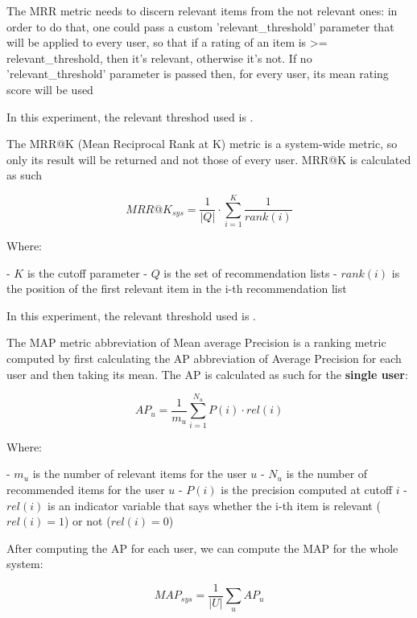 \documentclass[11pt]{article}
\begin{document}
The MRR metric needs to discern relevant items from the not relevant ones: in order to do that, one could pass a
custom 'relevant\_threshold' parameter that will be applied to every user, so that if a rating of an item
is >= relevant\_threshold, then it's relevant, otherwise it's not.
If no 'relevant\_threshold' parameter is passed then, for every user, its mean rating score will be used

In this experiment, the relevant threshod used is
.



The MRR@K (Mean Reciprocal Rank at K) metric is a system-wide metric, so only its result will be returned and
not those of every user. MRR@K is calculated as such

    \[
    MRR@K_{sys} = \frac{1}{|Q|}\cdot\sum_{i=1}^{K}\frac{1}{rank(i)}
    \]

    Where:

    - $K$ is the cutoff parameter
    - $Q$ is the set of recommendation lists
    - $rank(i)$ is the position of the first relevant item in the i-th recommendation list

\hfill\break
In this experiment, the relevant threshold used is
.



The MAP metric abbreviation of Mean average Precision is a ranking metric computed by first calculating the AP
abbreviation of Average Precision for each user and then taking its mean.
The AP is calculated as such for the \textbf{single user}:

    \[
    AP_u = \frac{1}{m_u}\sum_{i=1}^{N_u}P(i)\cdot rel(i)
    \]

    Where:

    - $m_u$ is the number of relevant items for the user $u$
    - $N_u$ is the number of recommended items for the user $u$
    - $P(i)$ is the precision computed at cutoff $i$
    - $rel(i)$ is an indicator variable that says whether the i-th item is relevant ($rel(i)=1$) or not ($rel(i)=0$)

\hfill\break

After computing the AP for each user, we can compute the MAP for the whole system:

    \[
    MAP_{sys} = \frac{1}{|U|}\sum_{u}AP_u
    \]
\end{document}
